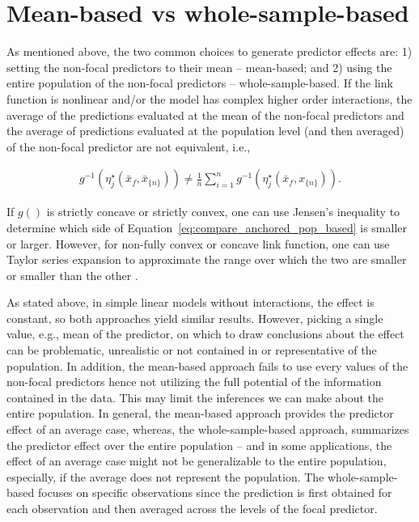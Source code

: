 \documentclass[10pt,letterpaper]{article}
\newcommand{\nset}[1]{#1_{\{n\}}}
\begin{document}
\section*{Mean-based vs whole-sample-based}

As mentioned above, the two common choices to generate predictor effects are: 1) setting the non-focal predictors to their mean -- mean-based; and 2) using the entire population of the non-focal predictors -- whole-sample-based. If the link function is nonlinear and/or the model has complex higher order interactions, the average of the predictions evaluated at the mean of the non-focal predictors and the average of predictions evaluated at the population level (and then averaged) of the non-focal predictor are not equivalent, i.e.,

\begin{align}\label{eq:compare_anchored_pop_based}
g^{-1} \left(\eta_j^\star(\bar{x}_f, \nset{\bar{x}})\right) \neq \frac{1}{n} \sum_{i=1}^n{ g^{-1} \left(\eta_j^\star(\bar{x}_f, \nset{x})\right)}.
\end{align}

If $g()$ is strictly concave or strictly convex, one can use Jensen's inequality to determine which side of Equation~\ref{eq:compare_anchored_pop_based} is smaller or larger. However, for non-fully convex or concave link function, one can use Taylor series expansion to approximate the range over which the two are smaller or smaller than the other \cite{hanmer2013behind}. 


As stated above, in simple linear models without interactions, the effect is constant, so both approaches yield similar results. However, picking a single value, e.g., mean of the predictor, on which to draw conclusions about the effect can be problematic, unrealistic or not contained in or representative of the population. In addition, the mean-based approach fails to use every values of the non-focal predictors hence not utilizing the full potential of the information contained in the data. This may limit the inferences we can make about the entire population. In general, the mean-based approach provides the predictor effect of an average case, whereas, the whole-sample-based approach, summarizes the predictor effect over the entire population -- and in some applications, the effect of an average case might not be generalizable to the entire population, especially, if the average does not represent the population. The whole-sample-based focuses on specific observations since the prediction is first obtained for each observation and then averaged across the levels of the focal predictor.
\end{document}

